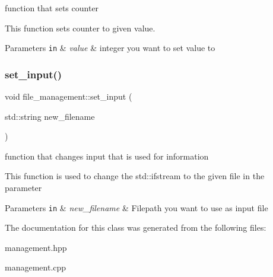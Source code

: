 function that sets counter 

This function sets counter to given value.


\begin{DoxyParams}[1]{Parameters}
\mbox{\tt in}  & {\em value} & integer you want to set value to \\
\hline
\end{DoxyParams}
\mbox{\label{classfile__management_a090d9aba4dd5a795428ccbfe8d4037e6}} 
\subsubsection{\texorpdfstring{set\+\_\+input()}{set\_input()}}
{\footnotesize\ttfamily void file\+\_\+management\+::set\+\_\+input (\begin{DoxyParamCaption}\item[{std\+::string}]{new\+\_\+filename }\end{DoxyParamCaption})}



function that changes input that is used for information 

This function is used to change the std\+::ifstream to the given file in the parameter


\begin{DoxyParams}[1]{Parameters}
\mbox{\tt in}  & {\em new\+\_\+filename} & Filepath you want to use as input file \\
\hline
\end{DoxyParams}


The documentation for this class was generated from the following files\+:\begin{DoxyCompactItemize}
\item 
management.\+hpp\item 
management.\+cpp\end{DoxyCompactItemize}
